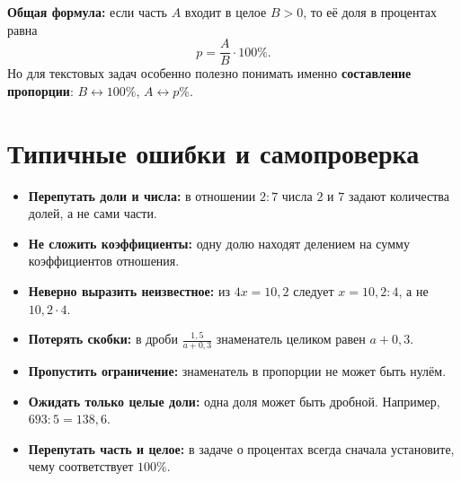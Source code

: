 \documentclass[a4paper,12pt]{article}
\newcommand{\key}[1]{\textcolor{darkaccent}{\textbf{#1}}}
\begin{document}
\key{Общая формула:} если часть \(A\) входит в целое \(B>0\), то её доля в процентах равна
\[
\boxed{p=\frac{A}{B}\cdot100\%.}
\]
Но для текстовых задач особенно полезно понимать именно \key{составление пропорции}: \(B\leftrightarrow100\%\), \(A\leftrightarrow p\%\).

\section{Типичные ошибки и самопроверка}
\begin{itemize}
\item \key{Перепутать доли и числа:} в отношении \(2:7\) числа \(2\) и \(7\) задают количества долей, а не сами части.
\item \key{Не сложить коэффициенты:} одну долю находят делением на сумму коэффициентов отношения.
\item \key{Неверно выразить неизвестное:} из \(4x=10{,}2\) следует \(x=10{,}2:4\), а не \(10{,}2\cdot4\).
\item \key{Потерять скобки:} в дроби \(\frac{1{,}5}{a+0{,}3}\) знаменатель целиком равен \(a+0{,}3\).
\item \key{Пропустить ограничение:} знаменатель в пропорции не может быть нулём.
\item \key{Ожидать только целые доли:} одна доля может быть дробной. Например, \(693:5=138{,}6\).
\item \key{Перепутать часть и целое:} в задаче о процентах всегда сначала установите, чему соответствует \(100\%\).
\end{itemize}

\clearpage
\end{document}
